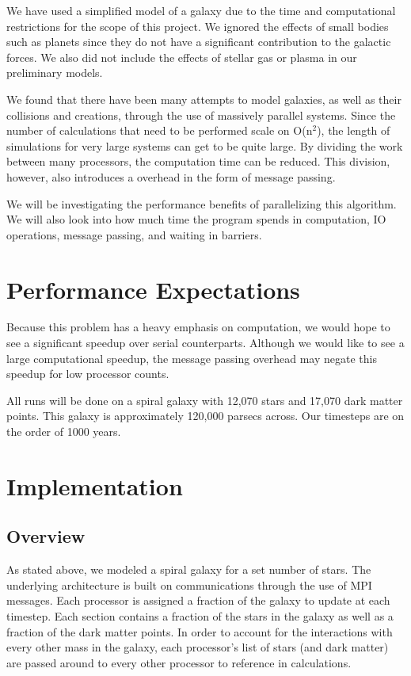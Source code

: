 \documentclass{article}
\begin{document}
We have used a simplified model of a galaxy due to the time and computational restrictions for the scope of this project.  We ignored the effects of small bodies such as planets since they do not have a significant contribution to the galactic forces.  We also did not include the effects of stellar gas or plasma in our preliminary models.

We found that there have been many attempts to model galaxies, as well as their collisions and creations, through the use of massively parallel systems.  Since the number of calculations that need to be performed scale on O(n$^2$), the length of simulations for very large systems can get to be quite large.  By dividing the work between many processors, the computation time can be reduced.  This division, however, also introduces a overhead in the form of message passing.  

We will be investigating the performance benefits of parallelizing this algorithm.  We will also look into how much time the program spends in computation, IO operations, message passing, and waiting in barriers.  


\section{Performance Expectations}

Because this problem has a heavy emphasis on computation, we would hope to see a significant speedup over serial counterparts.  Although we would like to see a large computational speedup, the message passing overhead may negate this speedup for low processor counts.  

All runs will be done on a spiral galaxy with 12,070 stars and 17,070 dark matter points.  This galaxy is approximately 120,000 parsecs across.  Our timesteps are on the order of 1000 years.


\section{Implementation}

\subsection{Overview}

As stated above, we modeled a spiral galaxy for a set number of stars.  The underlying architecture is built on communications through the use of MPI messages. Each processor is assigned a fraction of the galaxy to update at each timestep.  Each section contains a fraction of the stars in the galaxy as well as a fraction of the dark matter points.  In order to account for the interactions with every other mass in the galaxy, each processor's list of stars (and dark matter) are passed around to every other processor to reference in calculations.  
\end{document}
